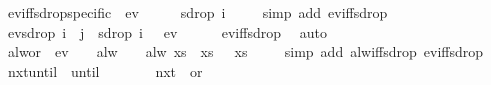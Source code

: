 \begin{isabellebody}
\endisatagproof
{\isafoldproof}%
%
\isadelimproof
\isanewline
%
\endisadelimproof
\isanewline
{}\isamarkupfalse%
\ ev{\isacharunderscore}iff{\isacharunderscore}sdrop{\isacharunderscore}specific{\isacharcolon}\ {\isachardoublequoteopen}{\isasymnot}\ ev\ {\isasympsi}\ {\isasymomega}\ {\isasymLongrightarrow}\ {\isasymnot}\ {\isasympsi}\ {\isacharparenleft}sdrop\ i\ {\isasymomega}{\isacharparenright}{\isachardoublequoteclose}\isanewline
%
\isadelimproof
\ \ %
\endisadelimproof
%
\isatagproof
{}\isamarkupfalse%
\ {\isacharparenleft}simp\ add{\isacharcolon}\ ev{\isacharunderscore}iff{\isacharunderscore}sdrop{\isacharparenright}%
\endisatagproof
{\isafoldproof}%
%
\isadelimproof
\isanewline
%
\endisadelimproof
\isanewline
{}\isamarkupfalse%
\ ev{\isacharunderscore}sdrop{\isacharcolon}\ {\isachardoublequoteopen}{\isasymexists}i\ {\isacharless}\ j{\isachardot}\ {\isasymphi}\ {\isacharparenleft}sdrop\ i\ {\isasymomega}{\isacharparenright}\ {\isasymLongrightarrow}\ ev\ {\isasymphi}\ {\isasymomega}{\isachardoublequoteclose}\isanewline
%
\isadelimproof
\ \ %
\endisadelimproof
%
\isatagproof
{}\isamarkupfalse%
\ ev{\isacharunderscore}iff{\isacharunderscore}sdrop\ \isamarkupfalse%
\ auto%
\endisatagproof
{\isafoldproof}%
%
\isadelimproof
\isanewline
%
\endisadelimproof
\isanewline
{}\isamarkupfalse%
\ alw{\isacharunderscore}or{\isacharcolon}\ {\isachardoublequoteopen}{\isasymnot}\ ev\ {\isasympsi}\ {\isasymomega}\ {\isasymLongrightarrow}\ alw\ {\isasymphi}\ {\isasymomega}\ {\isacharequal}\ alw\ {\isacharparenleft}{\isasymlambda}xs{\isachardot}\ {\isasymphi}\ xs\ {\isasymor}\ {\isasympsi}\ xs{\isacharparenright}\ {\isasymomega}{\isachardoublequoteclose}\isanewline
%
\isadelimproof
\ \ %
\endisadelimproof
%
\isatagproof
{}\isamarkupfalse%
\ {\isacharparenleft}simp\ add{\isacharcolon}\ alw{\isacharunderscore}iff{\isacharunderscore}sdrop\ ev{\isacharunderscore}iff{\isacharunderscore}sdrop{\isacharparenright}%
\endisatagproof
{\isafoldproof}%
%
\isadelimproof
\isanewline
%
\endisadelimproof
\isanewline
{}\isamarkupfalse%
\ nxt{\isacharunderscore}until{\isacharcolon}\ {\isachardoublequoteopen}{\isacharparenleft}{\isasymphi}\ until\ {\isasympsi}{\isacharparenright}\ {\isasymomega}\ {\isasymLongrightarrow}\ {\isasymnot}\ {\isasympsi}\ {\isasymomega}\ {\isasymLongrightarrow}\ nxt\ {\isacharparenleft}{\isasymphi}\ or\ {\isasympsi}{\isacharparenright}\ {\isasymomega}{\isachardoublequoteclose}\isanewline
%
\isadelimproof
\ \ %
\endisadelimproof
%
\isatagproof
{}\isamarkupfalse%

\end{isabellebody}
